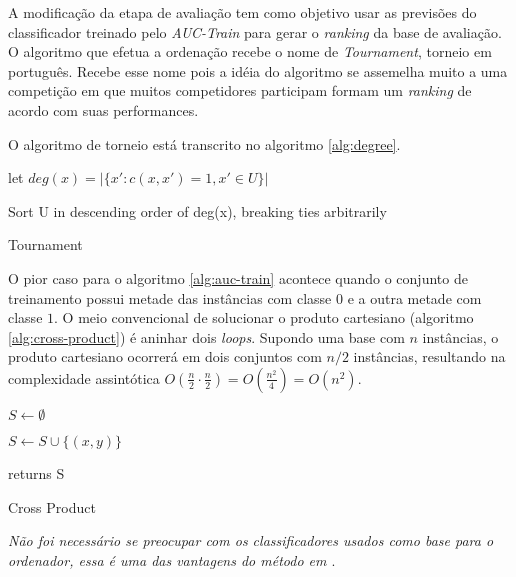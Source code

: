 A modificação da etapa de avaliação tem como objetivo usar as previsões do classificador treinado pelo \emph{AUC-Train} para gerar o \emph{ranking} da base de avaliação. O algoritmo que efetua a ordenação recebe o nome de \emph{Tournament}, torneio em português. Recebe esse nome pois a idéia do algoritmo se assemelha muito a uma competição em que muitos competidores participam formam um \emph{ranking} de acordo com suas performances. 

O algoritmo de torneio está transcrito no algoritmo \ref{alg:degree}.

\begin{algorithm}
    \begin{algorithmic}

            \STATE let $deg(x) = |\{x':c(x, x') = 1, x' \in U\}|$
        \ENDFOR

        \STATE Sort U in descending order of deg(x), breaking ties arbitrarily

        \caption{Tournament}
        \label{alg:tournament}

    \end{algorithmic}
\end{algorithm}

O pior caso para o algoritmo \ref{alg:auc-train} acontece quando o conjunto de treinamento possui metade das instâncias com classe $0$ e a outra metade com classe $1$. O meio convencional de solucionar o produto cartesiano (algoritmo \ref{alg:cross-product}) é aninhar dois \emph{loops}. Supondo uma base com $n$ instâncias, o produto cartesiano ocorrerá em dois conjuntos com $n/2$ instâncias, resultando na complexidade assintótica $O(\frac{n}{2} \cdot \frac{n}{2}) = O(\frac{n^2}{4}) = O(n^2)$.

\begin{algorithm}
    \begin{algorithmic}
        \STATE $S \gets \emptyset$

                \STATE $S \gets S \cup \{(x, y)\}$
            \ENDFOR
        \ENDFOR

        \STATE returns S

        \caption{Cross Product}
        \label{alg:cross-product}

    \end{algorithmic}
\end{algorithm}

\emph{Não foi necessário se preocupar com os classificadores usados como base para o ordenador, essa é uma das vantagens do método em \cite{langford08}}.

